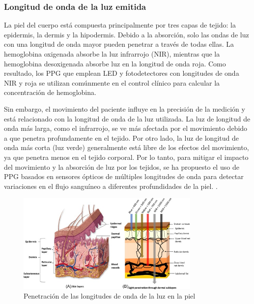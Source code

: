         \subsubsection{Longitud de onda de la luz emitida}
            La piel del cuerpo está compuesta principalmente por tres capas de tejido: la epidermis, la dermis y la hipodermis. Debido a la absorción, solo las ondas de luz con una longitud de onda mayor pueden penetrar a través de todas ellas. La hemoglobina oxigenada absorbe la luz infrarrojo (NIR), mientras que la hemoglobina desoxigenada absorbe luz en la longitud de onda roja. Como resultado, los PPG que emplean LED y fotodetectores con longitudes de onda NIR y roja se utilizan comúnmente en el control clínico para calcular la concentración de hemoglobina.

            Sin embargo, el movimiento del paciente influye en la precisión de la medición y está relacionado con la longitud de onda de la luz utilizada. La luz de longitud de onda más larga, como el infrarrojo, se ve más afectada por el movimiento debido a que penetra profundamente en el tejido. Por otro lado, la luz de longitud de onda más corta (luz verde) generalmente está libre de los efectos del movimiento, ya que penetra menos en el tejido corporal. Por lo tanto, para mitigar el impacto del movimiento y la absorción de luz por los tejidos, se ha propuesto el uso de PPG basados en sensores ópticos de múltiples longitudes de onda para detectar variaciones en el flujo sanguíneo a diferentes profundidades de la piel. \cite{Hiiberia_2023}.

            \begin{figure}[H]
                \centering
                \includegraphics[width=0.8\textwidth]{img/PPG_luz.jpg}
                \caption[Penetración de las longitudes de onda de la luz en la piel]{Penetración de las longitudes de onda de la luz en la piel\footnotemark}
                \label{fig:PPG_longitud_onda}
            \end{figure}

